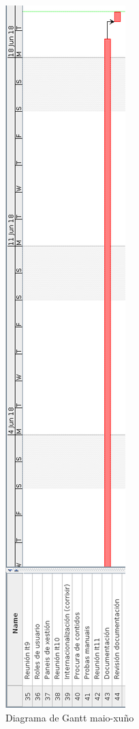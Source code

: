 \begin{figure}[H]
	\centering
	\includegraphics[scale=0.45,keepaspectratio=true]{./images/gantt/g11.png}
	\caption{Diagrama de Gantt maio-xuño}
\end{figure}

